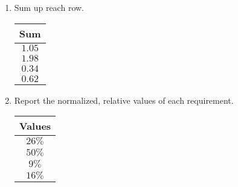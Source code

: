 \documentclass[12pt,titlepage]{article}
\begin{document}
\begin{enumerate}
          \item Sum up reach row.
            \begin{center}
              \begin{tabular}{ |c| } 
                \hline
                Sum \\ 
                \hline
                $1.05$ \\
                \hline
                $1.98$ \\
                \hline
                $0.34$ \\
                \hline
                $0.62$ \\
                \hline
              \end{tabular}
            \end{center}

          \item Report the normalized, relative values of each requirement.
            \begin{center}
              \begin{tabular}{ |c| } 
                \hline
                Values \\
                \hline
                $26\%$ \\
                \hline
                $50\%$ \\
                \hline
                $9\%$ \\
                \hline
                $16\%$ \\
                \hline
              \end{tabular}
            \end{center}
        \end{enumerate}
\end{document}
